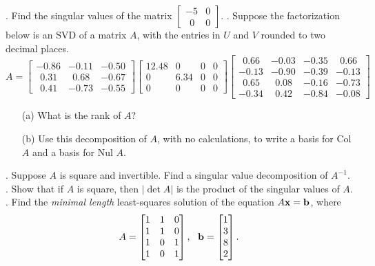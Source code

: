 \documentclass[12pt]{article}
\begin{document}
\vskip 10pt
. Find the singular values of the matrix $\begin{bmatrix}-5 & 0\\~~0 & 0\end{bmatrix}$.
\vskip 10pt
. Suppose the factorization below is an SVD of a matrix $A$, with the entries in $U$ and $V$ rounded to two decimal places.
\[
A = \begin{bmatrix} -0.86 & -0.11 & -0.50\\~~0.31 & ~~0.68 & -0.67\\~~0.41 & -0.73 & -0.55 \end{bmatrix}  
\begin{bmatrix} 12.48 & 0 & 0 & 0\\ 0 & 6.34 & 0 & 0 \\ 0 & 0 & 0 & 0\end{bmatrix} 
\begin{bmatrix} ~~0.66 & -0.03 & -0.35 & ~~0.66\\ -0.13 & -0.90 & -0.39 & -0.13 \\ ~~0.65 & ~~0.08 & -0.16 & -0.73 \\ -0.34 & ~~0.42 & -0.84 & -0.08 \end{bmatrix}
\]
 \begin{itemize}
 \item[(a)] What is the rank of $A$?
 \item[(b)] Use this decomposition of $A$, with no calculations, to write a basis for Col $A$ and a basis for Nul $A$.
 \end{itemize}
\vskip 10pt
. Suppose $A$ is square and invertible. Find a singular value decomposition of $A^{-1}$.
\vskip 10pt
. Show that if $A$ is square, then $| \det A |$ is the product of the singular values of $A$.
\vskip 10pt
. Find the \emph{minimal length} least-squares solution of the equation $A{\bf x} = {\bf b}$, where 
\[
A = \begin{bmatrix} 1 & 1 & 0\\1 & 1 & 0\\1 & 0 & 1\\ 1 & 0 & 1\end{bmatrix}, ~~{\bf b} = \begin{bmatrix} 1\\3\\8\\2\end{bmatrix}.
\]
\end{document}
